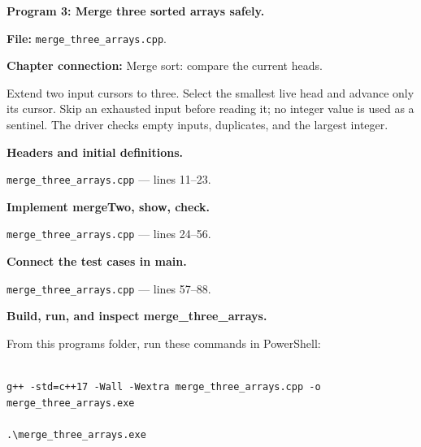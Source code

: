 \textbf{Program 3: Merge three sorted arrays safely.}

\textbf{File:} \texttt{merge\_three\_arrays.cpp}.

\textbf{Chapter connection:} Merge sort: compare the current heads.

Extend two input cursors to three. Select the smallest live head and advance only its cursor. Skip an exhausted input before reading it; no integer value is used as a sentinel. The driver checks empty inputs, duplicates, and the largest integer.



\begin{utpsteps}\setcounter{enumi}{0}\item \textbf{Headers and initial definitions.}\end{utpsteps}

\texttt{merge\_three\_arrays.cpp} --- lines 11--23.




\tcbbreak

\begin{utpsteps}\setcounter{enumi}{1}\item \textbf{Implement mergeTwo, show, check.}\end{utpsteps}

\texttt{merge\_three\_arrays.cpp} --- lines 24--56.






\tcbbreak

\begin{utpsteps}\setcounter{enumi}{2}\item \textbf{Connect the test cases in main.}\end{utpsteps}

\texttt{merge\_three\_arrays.cpp} --- lines 57--88.




\tcbbreak

\textbf{Build, run, and inspect merge\_three\_arrays.}

From this program\textquotesingle s folder, run these commands in PowerShell:

\begin{lstlisting}[style=utpterminal,language={}]

g++ -std=c++17 -Wall -Wextra merge_three_arrays.cpp -o merge_three_arrays.exe

.\merge_three_arrays.exe

\end{lstlisting}

